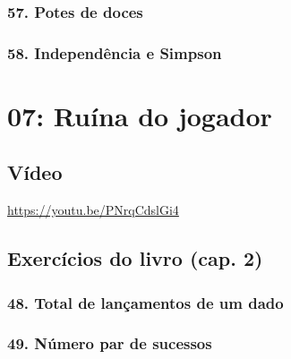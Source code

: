 \documentclass[
  11pt]{report}
\begin{document}
\hypertarget{potes-de-doces}{%
\subsection*{57. Potes de doces}\label{potes-de-doces}}

\hypertarget{independuxeancia-e-simpson}{%
\subsection*{58. Independência e Simpson}\label{independuxeancia-e-simpson}}

\hypertarget{ruuxedna-do-jogador}{%
\chapter*{07: Ruína do jogador}\label{ruuxedna-do-jogador}}

\hypertarget{vuxeddeo-6}{%
\section*{Vídeo}\label{vuxeddeo-6}}

\begin{center} \url{https://youtu.be/PNrqCdslGi4} \end{center}

\hypertarget{exercuxedcios-do-livro-cap.-2-3}{%
\section*{Exercícios do livro (cap. 2)}\label{exercuxedcios-do-livro-cap.-2-3}}

\hypertarget{total-de-lanuxe7amentos-de-um-dado}{%
\subsection*{48. Total de lançamentos de um dado}\label{total-de-lanuxe7amentos-de-um-dado}}

\hypertarget{nuxfamero-par-de-sucessos}{%
\subsection*{49. Número par de sucessos}\label{nuxfamero-par-de-sucessos}}
\end{document}
